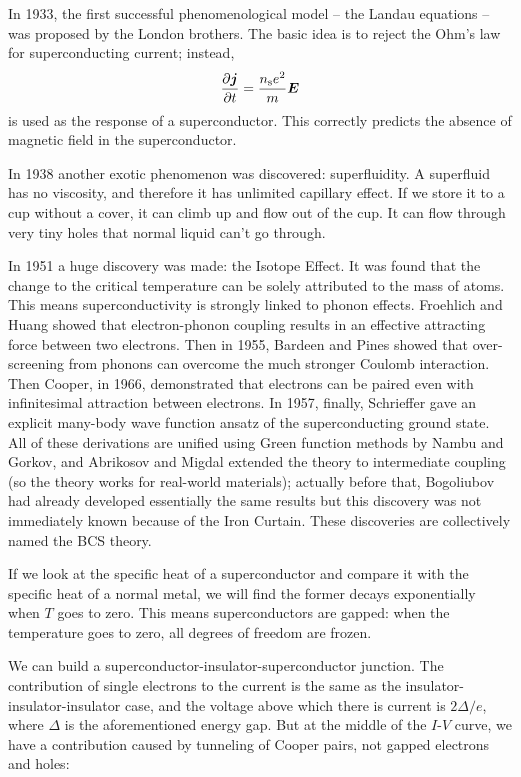\documentclass[hyperref, a4paper]{article}
\begin{document}
In 1933, the first successful phenomenological model -- 
the Landau equations -- was proposed by the London brothers.
The basic idea is to reject the Ohm's law for superconducting current;
instead, 
\begin{equation}
    \pdv{\vb*{j}}{t} = \frac{n_\text{s} e^2}{m} \vb*{E}
\end{equation}
is used as the response of a superconductor.
This correctly predicts the absence of magnetic field in the superconductor.

In 1938 another exotic phenomenon was discovered: superfluidity.
A superfluid has no viscosity, 
and therefore it has unlimited capillary effect.
If we store it to a cup without a cover, 
it can climb up and flow out of the cup.
It can flow through very tiny holes that 
normal liquid can't go through.

In 1951 a huge discovery was made: the Isotope Effect.
It was found that the change to the critical temperature 
can be solely attributed to the mass of atoms.
This means superconductivity is strongly linked to phonon effects.
Froehlich and Huang showed that 
electron-phonon coupling results in an effective attracting force between two electrons.
Then in 1955, Bardeen and Pines showed that 
over-screening from phonons can overcome the much stronger Coulomb interaction.
Then Cooper, in 1966, demonstrated 
that electrons can be paired even with infinitesimal attraction between electrons.
In 1957, finally, Schrieffer gave an explicit many-body wave function ansatz 
of the superconducting ground state.
All of these derivations are unified using Green function methods by Nambu and Gorkov, 
and Abrikosov and Migdal extended the theory to intermediate coupling
(so the theory works for real-world materials);
actually before that, Bogoliubov had already developed 
essentially the same results but this discovery was not immediately known 
because of the Iron Curtain.
These discoveries are collectively named the BCS theory.

If we look at the specific heat of a superconductor 
and compare it with the specific heat of a normal metal, 
we will find the former decays exponentially when $T$ goes to zero.
This means superconductors are gapped: 
when the temperature goes to zero, 
all degrees of freedom are frozen.

We can build a superconductor-insulator-superconductor junction.
The contribution of single electrons to the current 
is the same as the insulator-insulator-insulator case, 
and the voltage above which there is current is $2 \Delta / e$,
where $\Delta$ is the aforementioned energy gap.
But at the middle of the $I$-$V$ curve, 
we have a contribution caused by tunneling of Cooper pairs, 
not gapped electrons and holes: 
\end{document}
